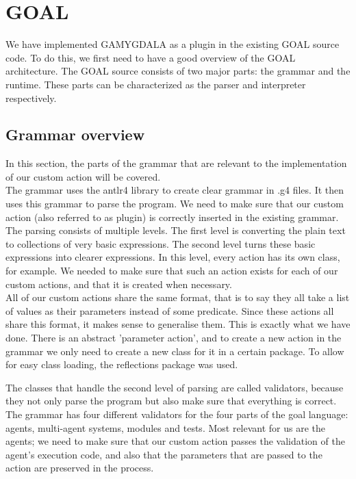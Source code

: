 \section{GOAL}
We have implemented GAMYGDALA as a plugin in the existing GOAL source code. To do this, we first need to have a good overview of the GOAL architecture.
The GOAL source consists of two major parts: the grammar and the runtime. These parts can be characterized as the parser and interpreter respectively.

\subsection{Grammar overview}
In this section, the parts of the grammar that are relevant to the implementation of our custom action will be covered. \\ 

The grammar uses the antlr4 library to create clear grammar in .g4 files. It then uses this grammar to parse the program. We need to make sure that our custom action (also referred to as plugin) is correctly inserted in the existing grammar. \\ 

The parsing consists of multiple levels. The first level is converting the plain text to collections of very basic expressions. The second level turns these basic expressions into clearer expressions. In this level, every action has its own class, for example. We needed to make sure that such an action exists for each of our custom actions, and that it is created when necessary. \\

All of our custom actions share the same format, that is to say they all take a list of values as their parameters instead of some predicate. Since these actions all share this format, it makes sense to generalise them. This is exactly what we have done. There is an abstract 'parameter action', and to create a new action in the grammar we only need to create a new class for it in a certain package. To allow for easy class loading, the reflections package was used.

The classes that handle the second level of parsing are called validators, because they not only parse the program but also make sure that everything is correct. The grammar has four different validators for the four parts of the goal language: agents, multi-agent systems, modules and tests. Most relevant for us are the agents; we need to make sure that our custom action passes the validation of the agent's execution code, and also that the parameters that are passed to the action are preserved in the process. \\ 

